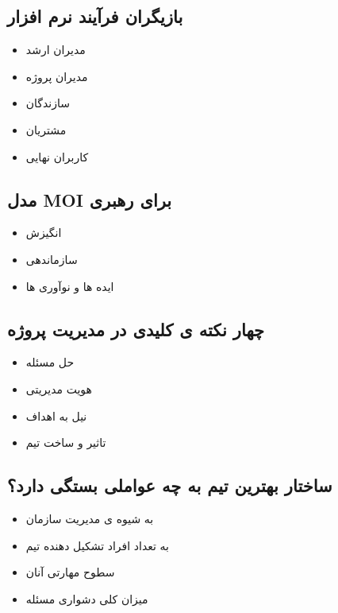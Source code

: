\documentclass{article}
\begin{document}
\subsection{بازیگران فرآیند نرم افزار}


\begin{itemize}
	\item مدیران ارشد
	\item مدیران پروژه
	\item سازندگان
	\item مشتریان
	\item کاربران نهایی
\end{itemize}



\subsection{مدل MOI برای رهبری}



\begin{itemize}
	\item انگیزش
	\item سازماندهی
	\item ایده ها و نوآوری ها
\end{itemize}




\subsection{چهار نکته ی کلیدی در مدیریت پروژه}


\begin{itemize}
	\item حل مسئله
	\item هویت مدیریتی
	\item نیل به اهداف
	\item تاثیر و ساخت تیم
\end{itemize}


\subsection{ساختار بهترین تیم به چه عواملی بستگی دارد؟}


\begin{itemize}
	\item به شیوه ی مدیریت سازمان
	\item به تعداد افراد تشکیل دهنده تیم
	\item سطوح مهارتی آنان
	\item میزان کلی دشواری مسئله
\end{itemize}
\end{document}
